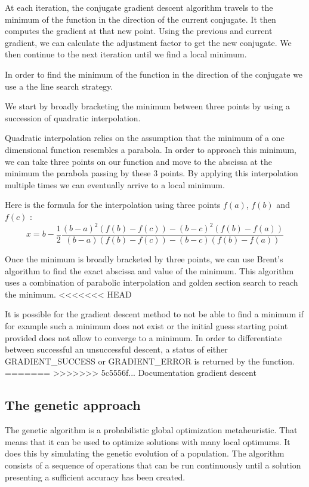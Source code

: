\documentclass{book}
\begin{document}
At each iteration, the conjugate gradient descent algorithm travels to the minimum of the function in the direction of the current conjugate. It then computes the gradient at that new point. Using the previous and current gradient, we can calculate the adjustment factor to get the new conjugate. We then continue to the next iteration until we find a local minimum.

In order to find the minimum of the function in the direction of the conjugate we use a the line search strategy. 

We start by broadly bracketing the minimum between three points by using a succession of quadratic interpolation. 

Quadratic interpolation relies on the assumption that the minimum of a one dimensional function resembles a parabola. In order to approach this minimum, we can take three points on our function and move to the abscissa at the minimum the parabola passing by these 3 points. By applying this interpolation multiple times we can eventually arrive to a local minimum. 

Here is the formula for the interpolation using three points $f(a)$, $f(b)$ and $f(c)$ :
\begin{equation}
    x = b - \frac{1}{2} \frac{(b - a)^2(f(b) - f(c)) - (b - c)^2(f(b) - f(a))}{(b - a)(f(b) - f(c)) - (b - c)(f(b) - f(a))}
\end{equation}

Once the minimum is broadly bracketed by three points, we can use Brent's algorithm to find the exact abscissa and value of the minimum. This algorithm uses a combination of parabolic interpolation and golden section search to reach the minimum.
<<<<<<< HEAD

It is possible for the gradient descent method to not be able to find a minimum if for example such a minimum does not exist or the initial guess starting point provided does not allow to converge to a minimum. In order to differentiate between successful an unsuccessful descent, a status of either GRADIENT\_SUCCESS or GRADIENT\_ERROR is returned by the function.
=======
>>>>>>> 5c5556f... Documentation gradient descent

\subsection{The genetic approach}

The genetic algorithm is a probabilistic global optimization metaheuristic. That means that it can be used to optimize solutions with many local optimums.
It does this by simulating the genetic evolution of a population. The algorithm consists of a sequence of operations that can be run continuously until a solution
presenting a sufficient accuracy has been created.
\end{document}
